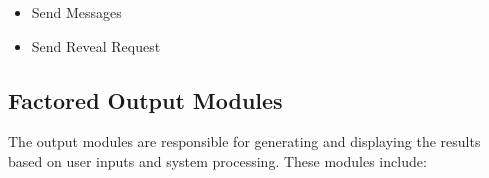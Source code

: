 \documentclass[12pt,a4paper]{article}
\begin{document}
\begin{itemize}
    \item Send Messages
    \item Send Reveal Request

\end{itemize}

\subsection{Factored Output Modules}
The output modules are responsible for generating and displaying the results based on user inputs and system processing. These modules include:
\end{document}
